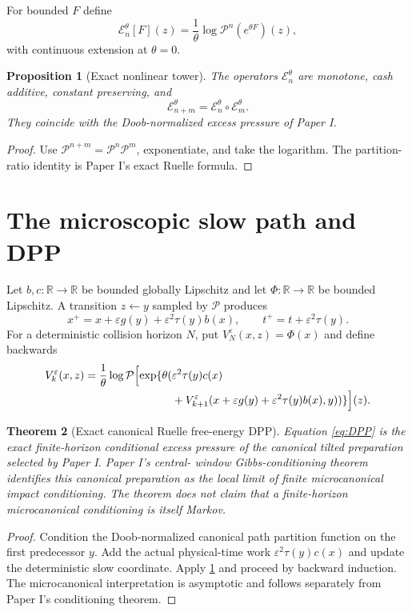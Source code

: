 \documentclass[11pt,reqno]{amsart}
\newtheorem{theorem}{Theorem}[section]
\newtheorem{proposition}[theorem]{Proposition}
\theoremstyle{definition}
\theoremstyle{remark}
\newcommand{\R}{\mathbb R}
\newcommand{\cE}{\mathcal E}
\newcommand{\cP}{\mathcal P}
\begin{document}
For bounded $F$ define
\[
 \cE_n^{\theta}[F](z)
 =\frac1\theta\log\cP^n(e^{\theta F})(z),
\]
with continuous extension at $\theta=0$.

\begin{proposition}[Exact nonlinear tower]\label{prop:tower}
The operators $\cE_n^\theta$ are monotone, cash additive, constant preserving,
and
\[
 \cE_{n+m}^\theta
 =\cE_n^\theta\circ\cE_m^\theta.
\]
They coincide with the Doob-normalized excess pressure of Paper I.
\end{proposition}
\begin{proof}
Use $\cP^{n+m}=\cP^n\cP^m$, exponentiate, and take the logarithm.  The
partition-ratio identity is Paper I's exact Ruelle formula.
\end{proof}

\section{The microscopic slow path and DPP}\label{sec:dpp}
Let $b,c:\R\to\R$ be bounded globally Lipschitz and let
$\Phi:\R\to\R$ be bounded Lipschitz.  A transition $z\leftarrow y$ sampled by
$\cP$ produces
\[
 x^+=x+\varepsilon g(y)
 +\varepsilon^2\tau(y)b(x),
 \qquad
 t^+=t+\varepsilon^2\tau(y).
\]
For a deterministic collision horizon $N$, put
$V_N^\varepsilon(x,z)=\Phi(x)$ and define backwards
\begin{equation}\label{eq:DPP}
\begin{aligned}
 V_k^\varepsilon(x,z)
 =\frac1\theta\log\cP\Bigl[
 \exp\{\theta(&\varepsilon^2\tau(y)c(x)\\
 &+V_{k+1}^\varepsilon(
 x+\varepsilon g(y)+\varepsilon^2\tau(y)b(x),y))\}
 \Bigr](z).
\end{aligned}
\end{equation}

\begin{theorem}[Exact canonical Ruelle free-energy DPP]\label{thm:DPP}
Equation \eqref{eq:DPP} is the exact finite-horizon conditional excess pressure
of the canonical tilted preparation selected by Paper I.  Paper I's central-
window Gibbs-conditioning theorem identifies this canonical preparation as the
local limit of finite microcanonical impact conditioning.  The theorem does
not claim that a finite-horizon microcanonical conditioning is itself Markov.
\end{theorem}
\begin{proof}
Condition the Doob-normalized canonical path partition function on the first
predecessor $y$.  Add the actual physical-time work
$\varepsilon^2\tau(y)c(x)$ and update the deterministic slow coordinate.
Apply \cref{prop:tower} and proceed by backward induction.  The
microcanonical interpretation is asymptotic and follows separately from Paper
I's conditioning theorem.
\end{proof}
\end{document}
